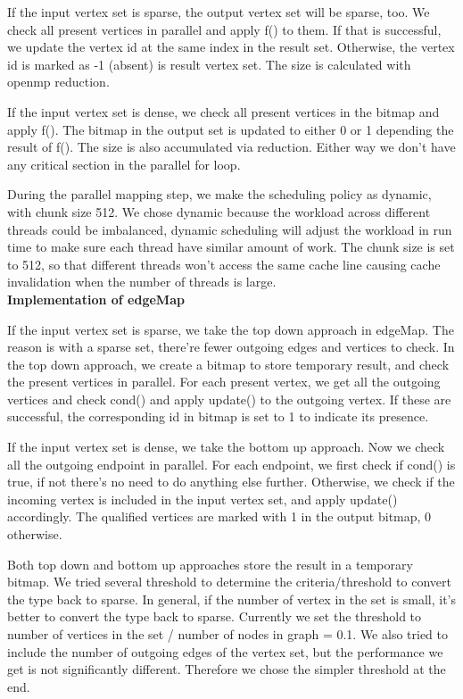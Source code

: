 \documentclass[11pt]{article}
\begin{document}
If the input vertex set is sparse, the output vertex set will be sparse, too. We check all present vertices in parallel and apply f() to them. If that is successful, we update the vertex id at the same index in the result set. Otherwise, the vertex id is marked as -1 (absent) is result vertex set. The size is calculated with openmp reduction. 

If the input vertex set is dense, we check all present vertices in the bitmap and apply f(). The bitmap in the output set is updated to either 0 or 1 depending the result of f(). The size is also accumulated via reduction. Either way we don't have any critical section in the parallel for loop. 

During the parallel mapping step, we make the scheduling policy as dynamic, with chunk size 512. We chose dynamic because the workload across different threads could be imbalanced, dynamic scheduling will adjust the workload in run time to make sure each thread have similar amount of work. The chunk size is set to 512, so that different threads won't access the same cache line causing cache invalidation when the number of threads is large. \\

\textbf{Implementation of edgeMap}

If the input vertex set is sparse, we take the top down approach in edgeMap. The reason is with a sparse set, there're fewer outgoing edges and vertices to check. In the top down approach, we create a bitmap to store temporary result, and check the present vertices in parallel. For each present vertex, we get all the outgoing vertices and check cond() and apply update() to the outgoing vertex. If these are successful, the corresponding id in bitmap is set to 1 to indicate its presence. 

If the input vertex set is dense, we take the bottom up approach. Now we check all the outgoing endpoint in parallel. For each endpoint, we first check if cond() is true, if not there's no need to do anything else further. Otherwise, we check if the incoming vertex is included in the input vertex set, and apply update() accordingly. The qualified vertices are marked with 1 in the output bitmap, 0 otherwise. 

Both top down and bottom up approaches store the result in a temporary bitmap. We tried several threshold to determine the criteria/threshold to convert the type back to sparse. In general, if the number of vertex in the set is small, it's better to convert the type back to sparse. Currently we set the threshold to number of vertices in the set / number of nodes in graph = 0.1. We also tried to include the number of outgoing edges of the vertex set, but the performance we get is not significantly different. Therefore we chose the simpler threshold at the end.
\end{document}

